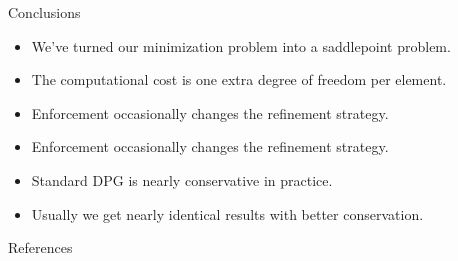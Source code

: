 \documentclass[final]{beamer}
\newlength{\onecolwid}
\begin{document}
\begin{frame}[t]
\begin{columns}[t]
\begin{column}{\onecolwid}
\begin{block}{Conclusions}
\begin{itemize}
  \item We've turned our minimization problem into a saddlepoint problem.
  \item The computational cost is one extra degree of freedom per element.
  \item Enforcement occasionally changes the refinement strategy.
  \item Enforcement occasionally changes the refinement strategy.
  \item Standard DPG is nearly conservative in practice.
  \item Usually we get nearly identical results with better conservation.
\end{itemize}

\end{block}
%
%
%
%
%

\begin{block}{References}

\nocite{*} %
\small{
\vspace{0.75in}}

\end{block}



\end{column}
\end{columns}
\end{frame}
\end{document}
